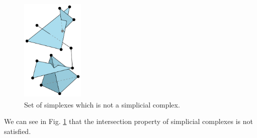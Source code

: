 \documentclass[../1.tex]{subfiles}
\begin{document}
    \begin{figure}[h]
        \centering
        \includegraphics[width=3cm, height=5cm]{sections/1/noncomplex}
        \caption{Set of simplexes which is not a simplicial complex.}
        \label{fig:2}
    \end{figure}

    We can see in Fig. \ref{fig:2} that the intersection property of simplicial complexes is not satisfied.\\
    \hfill \\





\end{document}
